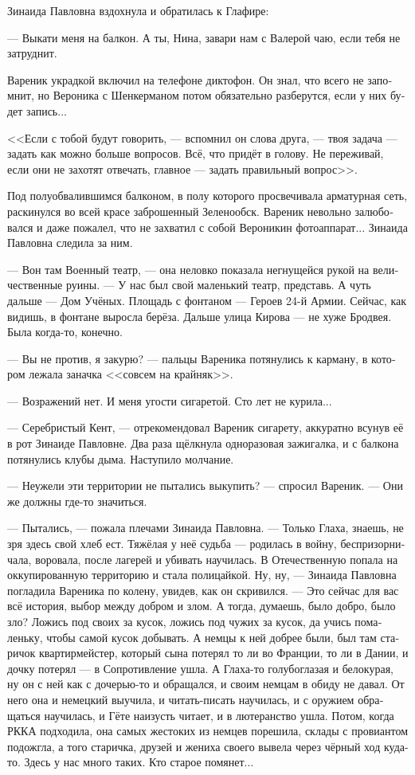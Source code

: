 \documentclass[a5paper,12pt,fleqn]{extbook}\usepackage{cooltooltips}\usepackage{polyglossia}\setdefaultlanguage[babelshorthands=true]{russian}\setotherlanguage{english}\defaultfontfeatures{Ligatures=TeX,Mapping=tex-text} \usepackage{xcolor}\definecolor{lightgray}{HTML}{bbbbbb}\color{lightgray}\newcommand{\ml}[3]{\textenglish{\textcolor{black}{#3}}}
\newcommand{\asterism}{\vspace{1em}{\centering\Large\bfseries$\ast~\ast~\ast$\par}\vspace{1em}}
\newcommand{\textspace}{\vspace{1em}{\centering\Large\bfseries<...>\par}\vspace{1em}}
\begin{document}
Зинаида Павловна вздохнула и обратилась к Глафире:

--- Выкати меня на балкон.
А ты, Нина, завари нам с Валерой чаю, если тебя не затруднит.

\asterism

\textspace

Вареник украдкой включил на телефоне диктофон.
Он знал, что всего не запомнит, но Вероника с Шенкерманом потом обязательно разберутся, если у них будет запись...

<<Если с тобой будут говорить, --- вспомнил он слова друга, --- твоя задача --- задать как можно больше вопросов.
Всё, что придёт в голову.
Не переживай, если они не захотят отвечать, главное --- задать правильный вопрос>>.

Под полуобвалившимся балконом, в полу которого просвечивала арматурная сеть, раскинулся во всей красе заброшенный Зеленообск.
Вареник невольно залюбовался и даже пожалел, что не захватил с собой Вероникин фотоаппарат...
Зинаида Павловна следила за ним.

--- Вон там Военный театр, --- она неловко показала негнущейся рукой на величественные руины.
--- У нас был свой маленький театр, представь.
А чуть дальше --- Дом Учёных.
Площадь с фонтаном --- Героев 24-й Армии.
Сейчас, как видишь, в фонтане выросла берёза.
Дальше улица Кирова --- не хуже Бродвея.
Была когда-то, конечно.

--- Вы не против, я закурю? --- пальцы Вареника потянулись к карману, в котором лежала заначка <<совсем на крайняк>>.

--- Возражений нет.
И меня угости сигаретой.
Сто лет не курила...

--- Серебристый Кент, --- отрекомендовал Вареник сигарету, аккуратно всунув её в рот Зинаиде Павловне.
Два раза щёлкнула одноразовая зажигалка, и с балкона потянулись клубы дыма.
Наступило молчание.

--- Неужели эти территории не пытались выкупить? --- спросил Вареник.
--- Они же должны где-то значиться.

--- Пытались, --- пожала плечами Зинаида Павловна.
--- Только Глаха, знаешь, не зря здесь свой хлеб ест.
Тяжёлая у неё судьба --- родилась в войну, беспризорничала, воровала, после лагерей и убивать научилась.
В Отечественную попала на оккупированную территорию и стала полицайкой.
Ну, ну, --- Зинаида Павловна погладила Вареника по колену, увидев, как он скривился.
--- Это сейчас для вас всё история, выбор между добром и злом.
А тогда, думаешь, было добро, было зло?
Ложись под своих за кусок, ложись под чужих за кусок, да учись помаленьку, чтобы самой кусок добывать.
А немцы к ней добрее были, был там старичок квартирмейстер, который сына потерял то ли во Франции, то ли в Дании, и дочку потерял --- в Сопротивление ушла.
А Глаха-то голубоглазая и белокурая, ну он с ней как с дочерью-то и обращался, и своим немцам в обиду не давал.
От него она и немецкий выучила, и читать-писать научилась, и с оружием обращаться научилась, и Гёте наизусть читает, и в лютеранство ушла.
Потом, когда РККА подходила, она самых жестоких из немцев порешила, склады с провиантом подожгла, а того старичка, друзей и жениха своего вывела через чёрный ход куда-то.
Здесь у нас много таких.
Кто старое помянет...
\end{document}
